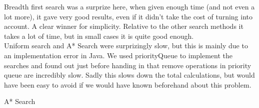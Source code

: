 \documentclass[11pt]{article}
\begin{document}
Breadth first search was a surprize here, when given enough time (and not even a lot more), it gave very good results, even if it didn't take the cost 
of turning into account. A clear winner for simplicity. Relative to the other search methods it takes a lot of time, but in small cases it is quite good enough. \\

Uniform search and A* Search were surprizingly slow, but this is mainly due to an implementation error in Java. We used priorityQueue to implement the searches
and found out just before handing in that remove operations in priority queue are incredibly slow. Sadly this slows down the total calculations, but would have 
been easy to avoid if we would have known beforehand about this problem.

A* Search
\end{document}
